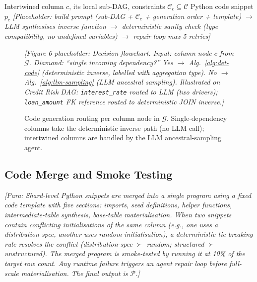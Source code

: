 \begin{algorithm}[t]
\caption{LLM Ancestral Sampling for Intertwined Constraints}
\label{alg:llm-sampling}
\begin{algorithmic}[1]
  \Require Intertwined column $c$, its local sub-DAG, constraints $\mathcal{C}_c \subseteq \mathcal{C}$
  \Ensure Python code snippet $p_c$
  \State \textit{[Placeholder: build prompt (sub-DAG + $\mathcal{C}_c$ + generation order + template)
         $\to$ LLM synthesises inverse function $\to$ deterministic sanity check
         (type compatibility, no undefined variables) $\to$ repair loop max 5 retries]}
\end{algorithmic}
\end{algorithm}

\begin{figure}[t]
  \centering
  \vspace{1.5cm}
  \textit{[Figure 6 placeholder: Decision flowchart.
  Input: column node $c$ from $\mathcal{G}$.
  Diamond: ``single incoming dependency?''
  Yes $\to$ Alg.~\ref{alg:det-code} (deterministic inverse, labelled with aggregation type).
  No $\to$ Alg.~\ref{alg:llm-sampling} (LLM ancestral sampling).
  Illustrated on Credit Risk DAG: \texttt{interest\_rate} routed to LLM (two drivers);
  \texttt{loan\_amount} FK reference routed to deterministic JOIN inverse.]}
  \vspace{1.5cm}
  \caption{Code generation routing per column node in $\mathcal{G}$.
           Single-dependency columns take the deterministic inverse path (no LLM call);
           intertwined columns are handled by the LLM ancestral-sampling agent.}
  \label{fig:codegen-routing}
\end{figure}

\subsection{Code Merge and Smoke Testing}
\textit{[Para: Shard-level Python snippets are merged into a single program using a fixed
code template with five sections: imports, seed definitions, helper functions, intermediate-table
synthesis, base-table materialisation.
When two snippets contain conflicting initialisations of the same column (e.g., one uses a
distribution spec, another uses random initialisation), a deterministic tie-breaking rule
resolves the conflict (distribution-spec $\succ$ random; structured $\succ$ unstructured).
The merged program is smoke-tested by running it at 10\% of the target row count.
Any runtime failure triggers an agent repair loop before full-scale materialisation.
The final output is $\mathcal{P}$.]}

